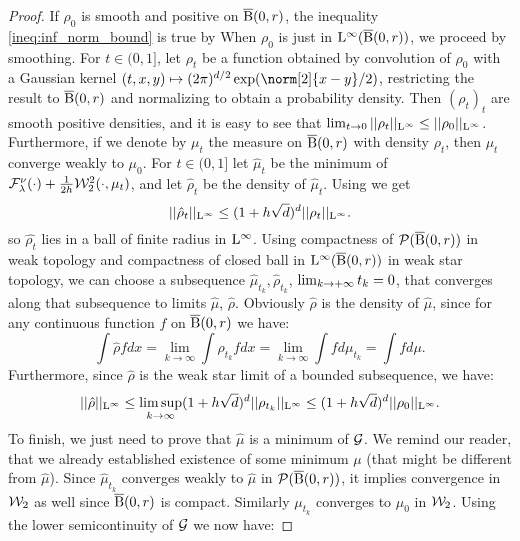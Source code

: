 \begin{proof}
If $\rho_0$ is smooth and positive on $\operatorname{\overline{B}}(0,r)$, the inequality \ref{ineq:inf_norm_bound} is true by \cite[Lemma 5.4.3.]{bonnotte2013unidimensional} When $\rho_0$ is just in $\mathrm{L}^{\infty}(\operatorname{\overline{B}}(0,r))$, we proceed by smoothing. 
For $t \in (0,1]$, let $\rho_t$ be a function obtained by convolution of $\rho_0$ with a Gaussian kernel $(t,x,y) \mapsto (2\pi)^{d/2} \exp(\norm[2]{x-y}/2)$, restricting the result to $\operatorname{\overline{B}}(0,r)$ and normalizing to obtain a probability density. Then $(\rho_t)_{t}$ are smooth positive densities, and it is easy to see that $\lim_{t \rightarrow 0} ||\rho_t||_{\mathrm{L}^{\infty}} \leq ||\rho_0||_{\mathrm{L}^{\infty}}$. Furthermore, if we denote by $\mu_t$ the measure on $\operatorname{\overline{B}}(0,r)$ with density $\rho_t$, then $\mu_t$ converge weakly to $\mu_0$.
For $t \in (0, 1]$ let $\hat{\mu}_t$ be the minimum of $ \mathcal{F}^{\nu}_{\lambda}(\cdot) + \frac{1}{2h} {\cal W}_2^2(\cdot, \mu_t)$, and let $\hat{\rho}_t$ be the density of $\hat{\mu}_t$. Using \cite[Lemma 5.4.3.]{bonnotte2013unidimensional} we get 
\[
||\hat{\rho}_t ||_{\mathrm{L}^{\infty}} \leq (1 + h\sqrt{d})^d ||\rho_t||_{\mathrm{L}^{\infty}}.
\]
so $\hat{\rho_{t}}$ lies in a ball of finite radius in $\mathrm{L}^{\infty}$.  Using compactness of $\mathcal{P}(\operatorname{\overline{B}}(0,r))$ in weak topology and compactness of closed ball in $\mathrm{L}^{\infty}(\operatorname{\overline{B}}(0,r))$ in weak star topology, we can choose a subsequence $\hat{\mu}_{t_k} , \hat{\rho}_{t_k}$, $\lim_{k \to +\infty} t_k =0$, that converges along that subsequence to limits $\hat{\mu}$, $\hat{\rho}$. Obviously $\hat{\rho}$ is the density of $\hat{\mu}$, since for any continuous function $f$  on $\operatorname{\overline{B}}(0,r)$ we have:
\[
\int \hat{\rho} f dx = \lim_{k \rightarrow \infty} \int \rho_{t_k} f dx = \lim_{k \rightarrow \infty} \int f d\mu_{t_k} = \int f d\mu.
\]
Furthermore, since $\hat{\rho}$ is the weak star limit of a bounded subsequence, we have:
\[
||\hat{\rho} ||_{\mathrm{L}^{\infty}} \leq \limsup_{k \rightarrow \infty}(1 + h\sqrt{d})^d ||\rho_{t_k}||_{\mathrm{L}^{\infty}} \leq (1 + h\sqrt{d})^d ||\rho_0||_{\mathrm{L}^{\infty}}.
\]
To finish, we just need to prove that $\hat{\mu}$ is a minimum of $\mathcal{G}$. We remind our reader, that we already established existence of some minimum $\mu$ (that might be different from $\hat{\mu}$). Since $\hat{\mu}_{t_k}$ converges weakly to $\hat{\mu}$ in $\mathcal{P}(\operatorname{\overline{B}}(0,r))$, it implies convergence  in ${\cal W}_2$ as well since $\operatorname{\overline{B}}(0,r)$ is compact. Similarly $\mu_{t_k}$ converges to $\mu_0$ in ${\cal W}_2$. Using the lower semicontinuity of $\mathcal{G}$ we now have:

\end{proof}
